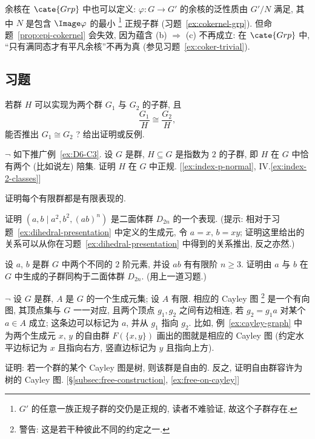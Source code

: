 余核在 $\cate{Grp}$ 中也可以定义: $\varphi : G \to G'$ 的余核的泛性质由 $G'/N$ 满足, 其中 $N$ 是包含 $\Image \varphi$ 的最小%
\footnote{$G'$ 的任意一族正规子群的交仍是正规的, 读者不难验证, 故这个子群存在.}%
正规子群 (习题~\ref{ex:cokernel-grp}). 但命题~\ref{prop:epi-cokernel} 会失效, 因为蕴含 (b) $\Longrightarrow$ (c) 不再成立: 在 $\cate{Grp}$ 中, ``只有满同态才有平凡余核''不再为真 (参见习题~\ref{ex:coker-trivial}).

\subsection*{习题}
{}

\begin{prob}
\label{ex:g1-g2-quotient}
若群 $H$ 可以实现为两个群 $G_1$ 与 $G_2$ 的子群, 且
\[
\frac{G_1}{H} \cong \frac{G_2}{H},
\]
能否推出 $G_1 \cong G_2$ ? 给出证明或反例.
\end{prob}

\begin{prob}
\label{ex:index-2-normal}
$\neg$ 如下推广例~\ref{ex:D6-C3}. 设 $G$ 是群, $H \subseteq G$ 是指数为 $2$ 的子群, 即 $H$ 在 $G$ 中恰有两个 (比如说左) 陪集. 证明 $H$ 在 $G$ 中正规. [\ref{ex:index-p-normal}, IV.\ref{ex:index-2-classes}]
\end{prob}

\begin{prob}
\label{ex:finite-presented}
证明每个有限群都是有限表现的.
\end{prob}

\begin{prob}
\label{ex:dihedral-presentation-2}
证明 $(a, b \mid a^2, b^2, (ab)^n)$ 是二面体群 $D_{2n}$ 的一个表现. (提示: 相对于习题~\ref{ex:dihedral-presentation} 中定义的生成元, 令 $a = x$, $b = xy$; 证明这里给出的关系可以从你在习题~\ref{ex:dihedral-presentation} 中得到的关系推出, 反之亦然.)
\end{prob}

\begin{prob}
\label{ex:order-2-dihedral}
设 $a$, $b$ 是群 $G$ 中两个不同的 $2$ 阶元素, 并设 $ab$ 有有限阶 $n \geq 3$. 证明由 $a$ 与 $b$ 在 $G$ 中生成的子群同构于二面体群 $D_{2n}$. (用上一道习题.)
\end{prob}

\begin{prob}
\label{ex:cayley-tree-free}
$\neg$ 设 $G$ 是群, $A$ 是 $G$ 的一个生成元集; 设 $A$ 有限. 相应的 Cayley 图%
\footnote{警告: 这是若干种彼此不同的约定之一.}%
是一个有向图, 其顶点集与 $G$ 一一对应, 且两个顶点 $g_1, g_2$ 之间有边相连, 若 $g_2 = g_1 a$ 对某个 $a \in A$ 成立; 这条边可以标记为 $a$, 并从 $g_1$ 指向 $g_2$. 比如, 例~\ref{ex:cayley-graph} 中为两个生成元 $x$, $y$ 的自由群 $F(\{x, y\})$ 画出的图就是相应的 Cayley 图 (约定水平边标记为 $x$ 且指向右方, 竖直边标记为 $y$ 且指向上方).

证明: 若一个群的某个 Cayley 图是树, 则该群是自由的. 反之, 证明自由群容许为树的 Cayley 图. [\S\ref{subsec:free-construction}, \ref{ex:free-on-cayley}]
\end{prob}

